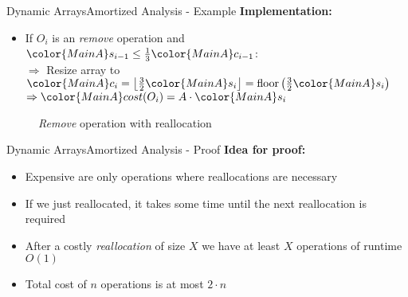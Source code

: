 \begin{frame}{Dynamic Arrays}{Amortized Analysis - Example}
  \textbf{Implementation:}
  \begin{itemize}
    \item
    If {\color{MainA}$O_i$} is an \textit{remove} operation and
    ${\color{MainA}s_{i-1}}
      \leq \frac{1}{3} {\color{MainA}c_{i-1}}$:\\
    $\Rightarrow$ Resize array to
    ${\color{MainA}c_i}
      = \left\lfloor\frac{3}{2} {\color{MainA}s_i} \right\rfloor
      = \mathrm{floor}\left(\frac{3}{2} {\color{MainA}s_i}\right)$\\
    $\Rightarrow {\color{MainA}cost(O_i)}
      = A \cdot {\color{MainA}s_i}$
  \end{itemize}
  \begin{figure}[!h]
    \def\FSAsize{12}\def\FSAelements{4}%
    \def\FSAcopy{0}\def\FSAdelete{0}\def\FSAinsert{0}%
    \def\FSAcopyarrow{0}%
    \def\FSAlabelsize{${\color{MainA}s_{i-1}} = 4$}%
    \def\FSAlabelcapacity{%
      ${\color{MainA}c_{i-1}} = 12%
      \geq {\color{MainA}s_{i-1}}$}%
    \hspace*{0.5em}\raisebox{2em}{$\Rightarrow$}\hspace*{0.5em}%
    \def\FSAsize{6}\def\FSAelements{0}%
    \def\FSAcopy{3}\def\FSAdelete{1}\def\FSAinsert{0}%
    \def\FSAlabelsize{${\color{MainA}s_i}
      = {\color{MainA}s_{i-1}} - 1$}%
    \def\FSAlabelcapacity{${\color{MainA}c_i}
      = \frac{3}{2}{\color{MainA}s_i}$ = 6}%
    \caption{\textit{Remove} operation with reallocation}
    \label{fig:dynamic_fields:amortized_analysis:remove}
  \end{figure}
\end{frame}


\begin{frame}{Dynamic Arrays}{Amortized Analysis - Proof}
  \textbf{Idea for proof:}
  \begin{itemize}
    \item
      Expensive are only operations where reallocations are necessary
    \item
      If we just reallocated, it takes some time until the next
      reallocation is required
    \item
      After a costly \textit{reallocation} of size $X$ we have at least
      $X$ operations of runtime $O(1)$
    \item
      Total cost of {\color{MainA}$n$} operations is
      at most {\color{MainA}$2 \cdot n$}
  \end{itemize}
\end{frame}

